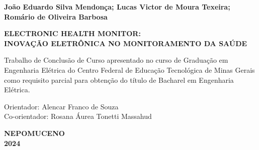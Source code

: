 \thispagestyle{empty}

\begin{center}

{\large \textbf{João Eduardo Silva Mendonça; Lucas Victor de Moura Texeira; Romário de Oliveira Barbosa}}

\vspace{6cm}

{\large \textbf{ELECTRONIC HEALTH MONITOR: \\ \vspace{0.5 cm} INOVAÇÃO ELETRÔNICA NO MONITORAMENTO DA SAÚDE}} \\
\vspace{0.7 cm}
\end{center}

\hspace{6.5cm}\begin{minipage}{8 cm}
     \nohyphens{Trabalho de Conclusão de Curso apresentado no curso de Graduação em Engenharia Elétrica do Centro Federal de Educação Tecnológica de Minas Gerais como requisito parcial para obtenção do título de Bacharel em Engenharia Elétrica.}

    \vspace{0.6 cm}

    Orientador: Alencar Franco de Souza \\
    Co-orientador: Rosana Áurea Tonetti Massahud
\end{minipage}
\vspace{3 cm}


\vspace{3cm}
\begin{center}
{\large \textbf{NEPOMUCENO}} \\
{\large \textbf{2024}}
\end{center}
